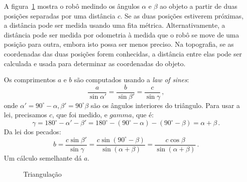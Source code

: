 A figura~\ref{fig.triangulation} mostra o robô medindo os ângulos $\alpha$ e $\beta$ ao objeto a partir de duas posições separadas por uma distância $c$. Se as duas posições estiverem próximas, a distância pode ser medida usando uma fita métrica. Alternativamente, a distância pode ser medida por odometria à medida que o robô se move de uma posição para outra, embora isto possa ser menos preciso. Na topografia, se as coordenadas das duas posições forem conhecidas, a distância entre elas pode ser calculada e usada para determinar as coordenadas do objeto.

Os comprimentos $a$ e $b$ são computados usando a \emph{law of sines}:
\begin{displaymath}
\frac{a}{\sin\alpha'} = \frac{b}{\sin\beta'} = \frac{c}{\sin\gamma}\,,
\end{displaymath}
onde $\alpha' = 90^\circ{} - \alpha, \beta' = 90^\circ{} \beta$ são os ângulos interiores do triângulo. Para usar a lei, precisamos $c$, que foi medido, e $gamma$, que é:
\begin{displaymath}
\gamma = 180^{\circ}-\alpha'-\beta' = 180^{\circ} - (90^{\circ} -
\alpha) - (90^{\circ} - \beta) = \alpha + \beta\,.
\end{displaymath}
Da lei dos pecados:
\begin{displaymath}
b = \frac{c\sin\beta'}{\sin\gamma} =
\frac{c\sin (90^{\circ} - \beta)}{\sin (\alpha + \beta)} =
\frac{c\cos\beta}{\sin (\alpha + \beta)}\,.
\end{displaymath}
Um cálculo semelhante dá $a$.

\begin{figure}
\begin{center}
\caption{Triangulação}\label{fig.triangulation}
\end{center}
\end{figure}


